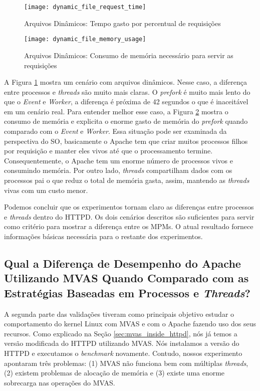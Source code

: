\begin{figure}[!h]
  \centering
  \texttt{[image: dynamic\_file\_request\_time]}

  \caption{Arquivos Dinâmicos: Tempo gasto por percentual de requisições}
  \label{fig:dynamic_file}
\end{figure}

\begin{figure}[!h]
  \centering
  \texttt{[image: dynamic\_file\_memory\_usage]}

  \caption{Arquivos Dinâmicos: Consumo de memória necessário para servir as requisições}
  \label{fig:dynamic_file_memory}
\end{figure}

A Figura \ref{fig:dynamic_file} mostra um cenário com arquivos dinâmicos. Nesse
caso, a diferença entre processos e \emph{threads} são muito mais claras. O
\emph{prefork} é muito mais lento do que o \emph{Event} e \emph{Worker}, a
diferença é próxima de 42 segundos o que é inaceitável em um cenário real.
Para entender melhor esse caso, a Figura \ref{fig:dynamic_file_memory} mostra o
consumo de memória e explicita o enorme gasto de memória do \emph{prefork}
quando comparado com o \emph{Event} e \emph{Worker}. Essa situação pode ser
examinada da perspectiva do SO, basicamente o Apache tem que criar muitos
processos filhos por requisição e manter eles vivos até que o processamento
termine. Consequentemente, o Apache tem um enorme número de processos vivos e
consumindo memória. Por outro lado, \emph{threads} compartilham dados com os
processos pai o que reduz o total de memória gasta, assim, mantendo as
\emph{threads} vivas com um custo menor.

Podemos concluir que os experimentos tornam claro as diferenças entre processos
e \emph{threads} dentro do HTTPD. Os dois cenários descritos são suficientes
para servir como critério para mostrar a diferença entre os MPMs. O atual
resultado fornece informações básicas necessária para o restante dos
experimentos.

\subsection{Qual a Diferença de Desempenho do Apache Utilizando MVAS Quando
Comparado com as Estratégias Baseadas em Processos e \emph{Threads}?}

A segunda parte das validações tiveram como principais objetivo estudar o
comportamento do kernel Linux com MVAS e com o Apache fazendo uso dos seus
recursos. Como explicado na Seção \ref{sec:mvas_inside_httpd}, nós já temos a
versão modificada do HTTPD utilizando MVAS. Nós instalamos a versão do HTTPD e
executamos o \emph{benchmark} novamente. Contudo, nossos experimento apontaram
três problemas: (1) MVAS não funciona bem com múltiplas \emph{threads}, (2)
existem problemas de alocação de memória e (3) existe uma enorme sobrecarga nas
operações do MVAS.

